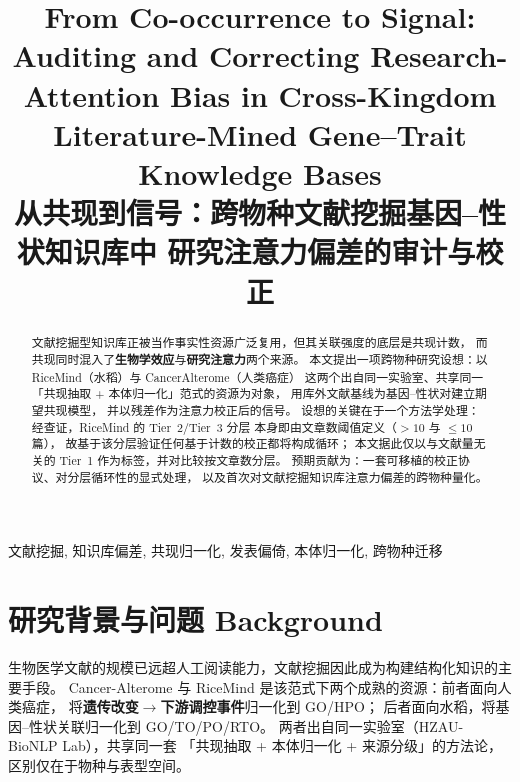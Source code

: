\documentclass[conference]{IEEEtran}
\begin{document}
\title{From Co-occurrence to Signal: Auditing and Correcting
Research-Attention Bias in Cross-Kingdom Literature-Mined
Gene--Trait Knowledge Bases\\
\large 从共现到信号：跨物种文献挖掘基因--性状知识库中
研究注意力偏差的审计与校正}

\author{
}

\maketitle

\begin{abstract}
文献挖掘型知识库正被当作事实性资源广泛复用，但其关联强度的底层是共现计数，
而共现同时混入了\textbf{生物学效应}与\textbf{研究注意力}两个来源。
本文提出一项跨物种研究设想：以 RiceMind（水稻）与 CancerAlterome（人类癌症）
这两个出自同一实验室、共享同一「共现抽取 + 本体归一化」范式的资源为对象，
用库外文献基线为基因--性状对建立期望共现模型，
并以残差作为注意力校正后的信号。
设想的关键在于一个方法学处理：经查证，RiceMind 的 Tier~2/Tier~3 分层
本身即由文章数阈值定义（$>10$ 与 $\leq 10$ 篇），
故基于该分层验证任何基于计数的校正都将构成循环；
本文据此仅以与文献量无关的 Tier~1 作为标签，并对比较按文章数分层。
预期贡献为：一套可移植的校正协议、对分层循环性的显式处理，
以及首次对文献挖掘知识库注意力偏差的跨物种量化。
\end{abstract}

\begin{IEEEkeywords}
文献挖掘, 知识库偏差, 共现归一化, 发表偏倚,
本体归一化, 跨物种迁移
\end{IEEEkeywords}

\section{研究背景与问题 Background}

生物医学文献的规模已远超人工阅读能力，文献挖掘因此成为构建结构化知识的主要手段。
Cancer-Alterome 与 RiceMind
是该范式下两个成熟的资源：前者面向人类癌症，
将\textbf{遗传改变}$\rightarrow$\textbf{下游调控事件}归一化到 GO/HPO；
后者面向水稻，将基因--性状关联归一化到 GO/TO/PO/RTO。
两者出自同一实验室（HZAU-BioNLP Lab），共享同一套
「共现抽取 + 本体归一化 + 来源分级」的方法论，区别仅在于物种与表型空间。
\end{document}
